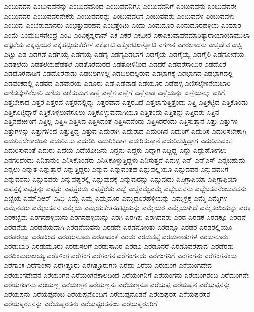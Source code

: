 {ಎಂಬುವವನ
ಎಂಬುವವನನ್ನು
ಎಂಬುವವನಿಂದ
ಎಂಬುವವನಿಗೂ
ಎಂಬುವವನಿಗೆ
ಎಂಬುವವನು
ಎಂಬುವವನೇ
ಎಂಬುವವರ
ಎಂಬುವವರನೇಕರು
ಎಂಬುವವರನ್ನು
ಎಂಬುವವರಿಗೆ
ಎಂಬುವವರು
ಎಂಬುವವಳ
ಎಂಬುವವಳು
ಎಂಬುವು
ಎಂಬೆರುಮಾನರು
ಎಂಭತ್ತುವರಹವ
ಎಂಭತ್ತೆಂಟು
ಎಂಮ
ಎಂಮದೂರ
ಎಂಮದೂರಹಳ್ಳಿಯ
ಎಂಮಾರ
ಎಂಮೆ
ಎಂಮೆಬಸವೇಂದ್ರ
ಎಂವಿ
ಎಂವಿಕೃಷ್ಣರಾವ್
ಎಕ
ಎಕರೆ
ಎಕವೀರ
ಎಕಾಎಕುವಾಘನಮಾರಿತ್ಯಾರಾಯಾಂಬಾಮುಲಾ
ಎಕ್ಕಟೆಯ
ಎಕ್ಕವ್ವೆಯರ
ಎಕ್ಕೆಹಟ್ಟಿಯಕೆರೆಗಳ
ಎಕ್ಕೋಟಿ
ಎಕ್ಕೋಟಿಏಳ್ಕೋಟಿ
ಎಗಣನ
ಎಗರಬಾದನು
ಎಚ್ಚದೇವ
ಎಚ್ವಿ
ಎಟ್ಟು
ಎಡ
ಎಡಗಡೆ
ಎಡಗಯ್ಯ
ಎಡಗೆಯ್ಯ
ಎಡಗೈ
ಎಡಗೈಎಡಭಾಗ
ಎಡಗೈಯ
ಎಡಗೈಯ್ಯ
ಎಡಗೈಲಿ
ಎಡಗೋಡೆಯ
ಎಡತಲೆಯ
ಎಡತಲೆಯಹೆಡತಲೆ
ಎಡತೊರೆಮಠದ
ಎಡತೋಳಿನಿಂದ
ಎಡದರೆ
ಎಡದರೆಸಾಯಿರ
ಎಡದೊರೆ
ಎಡದೊರೆನಾಡಿಗೆ
ಎಡದೊರೆನಾಡು
ಎಡಬಲಗಳಲ್ಲಿ
ಎಡಬಲದಲ್ಲಿರುವ
ಎಡಭಾಗಕ್ಕೆ
ಎಡಭಾಗದ
ಎಡಭಾಗದಲ್ಲಿ
ಎಡವಂಕದಲ್ಲಿ
ಎಡವದ
ಎಡವಾರಯ
ಎಡೂರು
ಎಡೆ
ಎಡೆನಾಡ
ಎಡೆಯೂರ
ಎಡೆಹಳ್ಳ
ಎಣಿಸಲ್ಕೇಳನೆಯಬಾರಿ
ಎಣಿಸಲ್ಕೇಳೆನೆಬಾರಿ
ಎಣಿಸು
ಎಣಿಸುಮಗ
ಎಣ್ಣೆ
ಎಣ್ಣೆಗ
ಎಣ್ಣೆಗೆ
ಎಣ್ಣೆನಾಡ
ಎಣ್ಣೆಯನ್ನು
ಎಣ್ಣೆಯನ್ನೂ
ಎತಿಗೆ
ಎತ್ತಬೇಕಾದ
ಎತ್ತರ
ಎತ್ತರದ
ಎತ್ತರದಲ್ಲಿದ್ದು
ಎತ್ತರವಾದ
ಎತ್ತರವಿದೆ
ಎತ್ತಲಾಗುತ್ತಿತ್ತೆಂದು
ಎತ್ತಿ
ಎತ್ತಿಕಟ್ಟಿದ
ಎತ್ತಿಕೊಂಡು
ಎತ್ತಿಕೊಟ್ಟಿದ್ದಾರೆ
ಎತ್ತಿಕೊಳ್ಳಲುವಸೂಲು
ಎತ್ತಿಕೊಳ್ಳುವುದಾಗಿಯೂ
ಎತ್ತಿತಂದು
ಎತ್ತಿತನ್ದು
ಎತ್ತಿದರು
ಎತ್ತಿನ
ಎತ್ತಿನಹೇಱಿಂಗೆ
ಎತ್ತಿಲ್ಲ
ಎತ್ತಿಸಿ
ಎತ್ತಿಸಿದ
ಎತ್ತಿಸಿದಂತೆ
ಎತ್ತಿಸಿದನೆಂದು
ಎತ್ತಿಸಿದರೆಂದು
ಎತ್ತಿಸುತ್ತಾನೆ
ಎತ್ತು
ಎತ್ತುಗಳ
ಎತ್ತುಗಳನ್ನು
ಎತ್ತುಗಳಿಂದ
ಎತ್ತುತ್ತಿದ್ದ
ಎತ್ತುವ
ಎದುರಾಗಿ
ಎದುರಾದ
ಎದುರಿಗಿನ
ಎದುರಿಗೆ
ಎದುರಿಸ
ಎದುರಿಸಬೇಕಾಗಿ
ಎದುರಿಸಬೇಕಾಯಿತು
ಎದುರಿಸಲು
ಎದುರಿಸಿ
ಎದುರಿಸಿದಾಗ
ಎದುರಿಸುತ್ತಾನೆ
ಎದುರಿಸುತ್ತಿದ್ದಾಗ
ಎದುರಿಸುವಂತ
ಎದುರಿಸುವಂತೆ
ಎದುರು
ಎದೆಯ
ಎದೆಯೋಜನು
ಎದ್ದನು
ಎದ್ದರು
ಎದ್ದಾಗ
ಎದ್ದಿದ್ದ
ಎದ್ದು
ಎದ್ದುಹೋಗಲು
ಎನಗರಿದೆಂದು
ಎನಿತಾನುಂ
ಎನಿಸಿಕೊಂಡರು
ಎನಿಸಿಕೊಳ್ಳುತ್ತಿದ್ದಳು
ಎನಿಸುತ್ತದೆ
ಎನುಳ್ಳ
ಎನ್
ಎನ್ಎಸ್
ಎನ್ನಬಹುದು
ಎನ್ನಲು
ಎನ್ನುತ
ಎನ್ನುತ್ತಾರೆ
ಎನ್ನುತ್ತಿದ್ದರು
ಎನ್ನುವ
ಎನ್ನುವಂತಹ
ಎನ್ನುವಲ್ಲಿಯೂ
ಎನ್ನುವವನ
ಎನ್ನುವವನಿಗೆ
ಎನ್ನುವವನು
ಎನ್ನುವವರು
ಎನ್ನುವಷ್ಟರಲ್ಲಿ
ಎನ್ನುವುದಕ್ಕೆ
ಎನ್ನುವುದನ್ನು
ಎನ್ನುವುದು
ಎಪಿಗ್ರಾಪಿಯಾ
ಎಪಿಗ್ರಾಫಿಯಾ
ಎಪ್ಪತ್ತಕ್ಕೆ
ಎಪ್ಪತ್ತನ್ನು
ಎಪ್ಪತ್ತು
ಎಪ್ಪತ್ತೆರಡು
ಎಪ್ಪತ್ತೆರೆಡು
ಎಬ್ಬೆ
ಎಬ್ಬೆಎಮ್ಬೆಎಮ್ಮೆ
ಎಬ್ಬೆಬಸವನು
ಎಬ್ಬೆಬಸವನೆಂಬುವವನು
ಎಬ್ಬೆಯ
ಎಮ್ಎಆರ್
ಎಮ್ಜಿ
ಎಮ್ಬೆ
ಎಮ್ಮ
ಎಮ್ಮದೂರ
ಎಮ್ಮದೂರಹಳ್ಳಿಯನ್ನು
ಎಮ್ಮಳ್ದಕ್ಕೆ
ಎಮ್ಮೆ
ಎಮ್ಮೆಗಳ
ಎಮ್ಮೆನವರು
ಎಮ್ಮೆಬಸವನ
ಎಮ್ಮೆಯ
ಎಮ್ಮೆಯಕೇತನಹಟ್ಟಿಯನ್ನು
ಎಮ್ಮೆಯರ
ಎಮ್ಮೆಯಾಗಿದೆ
ಎಮ್ಮೆಸಂದಿಯನ್ನು
ಎರಕ
ಎರಕಬ್ಬೆಯ
ಎರಗನಹಳ್ಳಿಯನು
ಎರಗನಹಳ್ಳಿಯನ್ನು
ಎರಗಿ
ಎರಗಿತು
ಎರಗಿದವರು
ಎರಡ
ಎರಡಕೆ
ಎರಡಕ್ಕೂ
ಎರಡನೆ
ಎರಡನೆಯ
ಎರಡನೆಯದಾಗಿ
ಎರಡನೆಯವನು
ಎರಡನೇ
ಎರಡನೋಂತು
ಎರಡನ್ನೂ
ಎರಡರ
ಎರಡರಲ್ಲಿಯೂ
ಎರಡರಲ್ಲೂ
ಎರಡರಿಂದ
ಎರಡರುನೂರು
ಎರಡಾದಂತೆ
ಎರಡು
ಎರಡುಕಟ್ಟೆ
ಎರಡುನಾಡುಗಳ
ಎರಡುನೂರು
ಎರಡುಬಾರಿ
ಎರಡುಮೂರು
ಎರಡುಸಲಗೆ
ಎರಡುಸಾವಿರ
ಎರಡೂ
ಎರಡೂವರೆ
ಎರಡೂವರೆಪಾವು
ಎರಡೆರಡು
ಎರದಿಂಮರಾಜಯ್ಯ
ಎರೆಕಳಿಂಗ
ಎರೆಗಂಗ
ಎರೆಗಂಗನ
ಎರೆಗಂಗನದು
ಎರೆಗಂಗನಿಗೆ
ಎರೆಗಂಗನು
ಎರೆಗಂಗನೆಂದು
ಎರೆಗಾಂಕ
ಎರೆಗಾಂಕನ
ಎರೆಗಿತ್ತೂರು
ಎರೆಗಿತ್ತೂರುಗಣ
ಎರೆದು
ಎರೆಯ
ಎರೆಯಂಗ
ಎರೆಯಂಗದೇವ
ಎರೆಯಂಗದೇವನ
ಎರೆಯಂಗನ
ಎರೆಯಂಗನಕಾಲದಿಂದ
ಎರೆಯಂಗನಿಗೆ
ಎರೆಯಂಗನು
ಎರೆಯಂಗನೆಂಬ
ಎರೆಯಂಗನೇ
ಎರೆಯಗಂಗನು
ಎರೆಯಣ್ಣ
ಎರೆಯಣ್ಣನ
ಎರೆಯಣ್ಣನು
ಎರೆಯಣ್ಣನೂ
ಎರೆಯಪ್ಪ
ಎರೆಯಪ್ಪನ
ಎರೆಯಪ್ಪನನ್ನು
ಎರೆಯಪ್ಪನು
ಎರೆಯಪ್ಪನೆಂಬ
ಎರೆಯಪ್ಪನೊಂದಿಗೆ
ಎರೆಯಪ್ಪನೊಡನೆ
ಎರೆಯಪ್ಪರಸ
ಎರೆಯಪ್ಪರಸನ
ಎರೆಯಪ್ಪರಸನನ್ನು
ಎರೆಯಪ್ಪರಸನು
ಎರೆಯಪ್ಪರಸನೆಂಬ
ಎರೆಯಪ್ಪರಸರಿಗೆ
}
